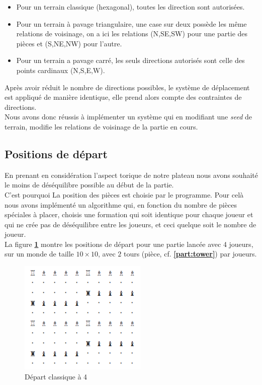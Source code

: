         \begin{itemize}
            \item Pour un terrain classique (hexagonal), toutes les direction sont autorisées.\\
            \item Pour un terrain à pavage triangulaire, une case sur deux possède les même relations de voisinage, on a ici les relations (N,SE,SW) pour une partie des pièces et (S,NE,NW) pour l'autre. \\
            \item Pour un terrain a pavage carré, les seuls directions autorisés sont celle des points cardinaux (N,S,E,W). \\ 
        \end{itemize}
        
        Après avoir réduit le nombre de directions possibles, le système de déplacement est appliqué de manière identique, elle prend alors compte des contraintes de directions. \\
        Nous avons donc réussis à implémenter un système qui en modifiant une \textit{seed} de terrain, modifie les relations de voisinage de la partie en cours.  
    \subsection{Positions de départ}
    En prenant en considération l'aspect torique de notre plateau nous avons souhaité le moins de déséquilibre possible au début de la partie. \\
    C'est pourquoi La position des pièces est choisie par le programme. Pour celà nous avons implémenté un algorithme qui, en fonction du nombre de pièces spéciales à placer, choisis une formation qui soit identique pour chaque joueur et qui ne crée pas de déséquilibre entre les joueurs, et ceci quelque soit le nombre de joueur. \\
            La figure \textbf{\ref{fig:depart_classique_a_4}} montre les positions de départ pour une partie lancée avec 4 joueurs, sur un monde de taille $10\times10$, avec  $2$ tours (pièce, cf. \textbf{\ref{part:tower}}) par joueurs.
            
            \begin{figure}[H]
                \centering
                \includegraphics[scale=0.6]{img/depart_classique_a_4.png}
                \caption{Départ classique à 4}
                \label{fig:depart_classique_a_4}
            \end{figure}


